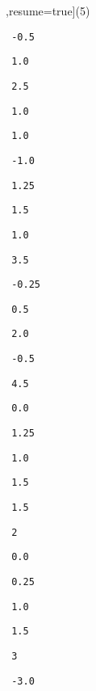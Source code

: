 \begin{solution}
\begin{sltasks}[counter-format=1.tsk[1],resume=true](5)
    \task
    \begin{items}
      \item \texttt{ -0.5 }
      \item \texttt{ 1.0 }
      \item \texttt{ 2.5 }
      \item \texttt{ 1.0 }
      \item \texttt{ 1.0 }
    \end{items}
    \task
    \begin{items}
      \item \texttt{ -1.0 }
      \item \texttt{ 1.25 }
      \item \texttt{ 1.5 }
      \item \texttt{ 1.0 }
      \item \texttt{ 3.5 }
    \end{items}
    \task
    \begin{items}
      \item \texttt{ -0.25 }
      \item \texttt{ 0.5 }
      \item \texttt{ 2.0 }
      \item \texttt{ -0.5 }
      \item \texttt{ 4.5 }
    \end{items}
    \task
    \begin{items}
      \item \texttt{ 0.0 }
      \item \texttt{ 1.25 }
      \item \texttt{ 1.0 }
      \item \texttt{ 1.5 }
      \item \texttt{ 1.5 }
    \end{items}
    \task
    \begin{items}
      \item \texttt{ 2 }
      \item \texttt{ 0.0 }
      \item \texttt{ 0.25 }
      \item \texttt{ 1.0 }
      \item \texttt{ 1.5 }
    \end{items}
    \task
    \begin{items}
      \item \texttt{ 3 }
      \item \texttt{ -3.0 }

\end{items}
\end{sltasks}
\end{solution}

